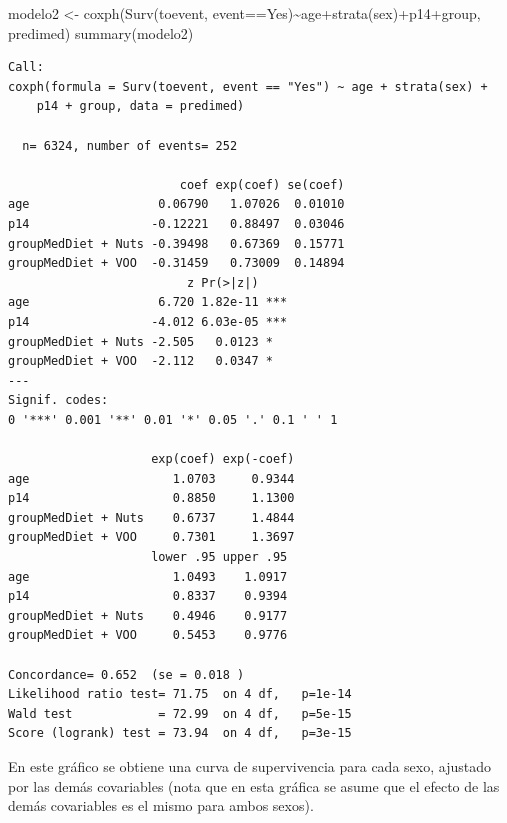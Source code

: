 \documentclass[
]{book}
\newenvironment{Shaded}{\begin{snugshade}}{\end{snugshade}}
\newcommand{\AttributeTok}[1]{\textcolor[rgb]{0.77,0.63,0.00}{#1}}
\newcommand{\DecValTok}[1]{\textcolor[rgb]{0.00,0.00,0.81}{#1}}
\newcommand{\FloatTok}[1]{\textcolor[rgb]{0.00,0.00,0.81}{#1}}
\newcommand{\FunctionTok}[1]{\textcolor[rgb]{0.00,0.00,0.00}{#1}}
\newcommand{\NormalTok}[1]{#1}
\newcommand{\OtherTok}[1]{\textcolor[rgb]{0.56,0.35,0.01}{#1}}
\newcommand{\SpecialCharTok}[1]{\textcolor[rgb]{0.00,0.00,0.00}{#1}}
\newcommand{\StringTok}[1]{\textcolor[rgb]{0.31,0.60,0.02}{#1}}
\begin{document}
\begin{Shaded}
\begin{Highlighting}[]
\NormalTok{modelo2 }\OtherTok{\textless{}{-}} \FunctionTok{coxph}\NormalTok{(}\FunctionTok{Surv}\NormalTok{(toevent, event}\SpecialCharTok{==}\StringTok{\textquotesingle{}Yes\textquotesingle{}}\NormalTok{)}\SpecialCharTok{\textasciitilde{}}\NormalTok{age}\SpecialCharTok{+}\FunctionTok{strata}\NormalTok{(sex)}\SpecialCharTok{+}\NormalTok{p14}\SpecialCharTok{+}\NormalTok{group, predimed)}
\FunctionTok{summary}\NormalTok{(modelo2)}
\end{Highlighting}
\end{Shaded}

\begin{verbatim}
Call:
coxph(formula = Surv(toevent, event == "Yes") ~ age + strata(sex) + 
    p14 + group, data = predimed)

  n= 6324, number of events= 252 

                        coef exp(coef) se(coef)
age                  0.06790   1.07026  0.01010
p14                 -0.12221   0.88497  0.03046
groupMedDiet + Nuts -0.39498   0.67369  0.15771
groupMedDiet + VOO  -0.31459   0.73009  0.14894
                         z Pr(>|z|)    
age                  6.720 1.82e-11 ***
p14                 -4.012 6.03e-05 ***
groupMedDiet + Nuts -2.505   0.0123 *  
groupMedDiet + VOO  -2.112   0.0347 *  
---
Signif. codes:  
0 '***' 0.001 '**' 0.01 '*' 0.05 '.' 0.1 ' ' 1

                    exp(coef) exp(-coef)
age                    1.0703     0.9344
p14                    0.8850     1.1300
groupMedDiet + Nuts    0.6737     1.4844
groupMedDiet + VOO     0.7301     1.3697
                    lower .95 upper .95
age                    1.0493    1.0917
p14                    0.8337    0.9394
groupMedDiet + Nuts    0.4946    0.9177
groupMedDiet + VOO     0.5453    0.9776

Concordance= 0.652  (se = 0.018 )
Likelihood ratio test= 71.75  on 4 df,   p=1e-14
Wald test            = 72.99  on 4 df,   p=5e-15
Score (logrank) test = 73.94  on 4 df,   p=3e-15
\end{verbatim}

En este gráfico se obtiene una curva de supervivencia para cada sexo, ajustado por las demás covariables (nota que en esta gráfica se asume que el efecto de las demás covariables es el mismo para ambos sexos).

\begin{Shaded}
\end{Shaded}
\end{document}
